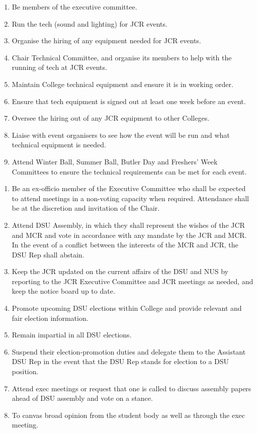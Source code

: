 \begin{enumerate}
    \item Be members of the executive committee.
    \item Run the tech (sound and lighting) for JCR events.
    \item Organise the hiring of any equipment needed for JCR events.
    \item Chair Technical Committee, and organise its members to help with the running of tech at JCR events.
    \item Maintain College technical equipment and ensure it is in working order.
    \item Ensure that tech equipment is signed out at least one week before an event.
    \item Oversee the hiring out of any JCR equipment to other Colleges. 
    \item Liaise with event organisers to see how the event will be run and what technical equipment is needed. 
    \item Attend Winter Ball, Summer Ball, Butler Day and Freshers' Week Committees to ensure the technical requirements can be met for each event.
\end{enumerate}

\label{sc: DSU Rep}
\begin{enumerate}
    \item Be an ex-officio member of the Executive Committee who shall be expected to attend meetings in a non-voting capacity when required. Attendance shall be at the discretion and invitation of the Chair. 
    \item Attend DSU Assembly, in which they shall represent the wishes of the JCR and MCR and vote in accordance with any mandate by the JCR and MCR. In the event of a conflict between the interests of the MCR and JCR, the DSU Rep shall abstain.
    \item Keep the JCR updated on the current affairs of the DSU and NUS by reporting to the JCR Executive Committee and JCR meetings as needed, and keep the notice board up to date.
    \item Promote upcoming DSU elections within College and provide relevant and fair election information.
    \item Remain impartial in all DSU elections.
    \item Suspend their election-promotion duties and delegate them to the Assistant DSU Rep in the event that the DSU Rep stands for election to a DSU position.
    \item Attend exec meetings or request that one is called to discuss assembly papers ahead of DSU assembly and vote on a stance.
    \item To canvas broad opinion from the student body as well as through the exec meeting.

\end{enumerate}

